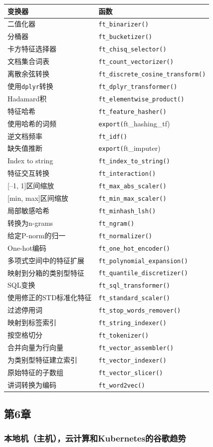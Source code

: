 \documentclass[
]{article}
\begin{document}
\begin{longtable}[]{@{}ll@{}}
\toprule
变换器 & 函数\tabularnewline
\midrule
\endhead
二值化器 & \texttt{ft\_binarizer()}\tabularnewline
分桶器 & \texttt{ft\_bucketizer()}\tabularnewline
卡方特征选择器 & \texttt{ft\_chisq\_selector()}\tabularnewline
文档集合词表 & \texttt{ft\_count\_vectorizer()}\tabularnewline
离散余弦转换 & \texttt{ft\_discrete\_cosine\_transform()}\tabularnewline
使用\texttt{dplyr}转换 &
\texttt{ft\_dplyr\_transformer()}\tabularnewline
Hadamard积 & \texttt{ft\_elementwise\_product()}\tabularnewline
特征哈希 & \texttt{ft\_feature\_hasher()}\tabularnewline
使用哈希的词频 & \texttt{export(}ft\_hashing\_tf)\tabularnewline
逆文档频率 & \texttt{ft\_idf()}\tabularnewline
缺失值推断 & \texttt{export(}ft\_imputer)\tabularnewline
Index to string & \texttt{ft\_index\_to\_string()}\tabularnewline
特征交互转换 & \texttt{ft\_interaction()}\tabularnewline
{[}--1, 1{]}区间缩放 & \texttt{ft\_max\_abs\_scaler()}\tabularnewline
{[}min, max{]}区间缩放 & \texttt{ft\_min\_max\_scaler()}\tabularnewline
局部敏感哈希 & \texttt{ft\_minhash\_lsh()}\tabularnewline
转换为n-grams & \texttt{ft\_ngram()}\tabularnewline
给定P-norm的归一 & \texttt{ft\_normalizer()}\tabularnewline
One-hot编码 & \texttt{ft\_one\_hot\_encoder()}\tabularnewline
多项式空间中的特征扩展 &
\texttt{ft\_polynomial\_expansion()}\tabularnewline
映射到分箱的类别型特征 &
\texttt{ft\_quantile\_discretizer()}\tabularnewline
SQL变换 & \texttt{ft\_sql\_transformer()}\tabularnewline
使用修正的STD标准化特征 & \texttt{ft\_standard\_scaler()}\tabularnewline
过滤停用词 & \texttt{ft\_stop\_words\_remover()}\tabularnewline
映射到标签索引 & \texttt{ft\_string\_indexer()}\tabularnewline
按空格切分 & \texttt{ft\_tokenizer()}\tabularnewline
合并向量为行向量 & \texttt{ft\_vector\_assembler()}\tabularnewline
为类别型特征建立索引 & \texttt{ft\_vector\_indexer()}\tabularnewline
原始特征的子数组 & \texttt{ft\_vector\_slicer()}\tabularnewline
讲词转换为编码 & \texttt{ft\_word2vec()}\tabularnewline
\bottomrule
\end{longtable}

\hypertarget{ux7b2c6ux7ae0}{%
\subsection{第6章}\label{ux7b2c6ux7ae0}}

\hypertarget{ux672cux5730ux673aux4e3bux673aux4e91ux8ba1ux7b97ux548ckubernetesux7684ux8c37ux6b4cux8d8bux52bf}{%
\subsubsection{本地机（主机），云计算和Kubernetes的谷歌趋势}\label{ux672cux5730ux673aux4e3bux673aux4e91ux8ba1ux7b97ux548ckubernetesux7684ux8c37ux6b4cux8d8bux52bf}}
\end{document}
